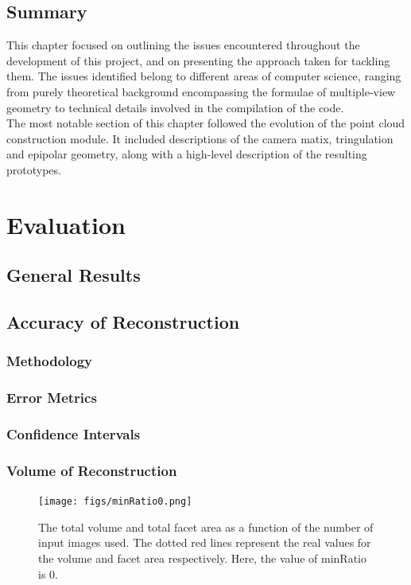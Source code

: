 \documentclass[12pt,a4paper,twoside,openright]{report}
\begin{document}
\section{Summary} 
This chapter focused on outlining the issues encountered throughout the development of this project, and on presenting the approach taken for tackling them. The issues identified belong to different areas of computer science, ranging from purely theoretical background encompassing the formulae of multiple-view geometry to technical details involved in the compilation of the code. \\
\linebreak
The most notable section of this chapter followed the evolution of the point cloud construction module. It included descriptions of the camera matix, tringulation and epipolar geometry, along with a high-level description of the resulting prototypes.

\chapter{Evaluation}
\section{General Results}

\section{Accuracy of Reconstruction}
\subsection{Methodology}
\subsection{Error Metrics}
\subsection{Confidence Intervals}
\subsection{Volume of Reconstruction}
\begin{figure}
\begin{center} 
\texttt{[image: figs/minRatio0.png]}	
\caption{The total volume and total facet area as a function of the number of input images used. The dotted red lines represent the real values for the volume and facet area respectively. Here, the value of minRatio is 0.}
\end{center}
\end{figure}
\end{document}
